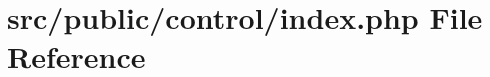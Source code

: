 \hypertarget{control_2index_8php}{}\section{src/public/control/index.php File Reference}
\label{control_2index_8php}
